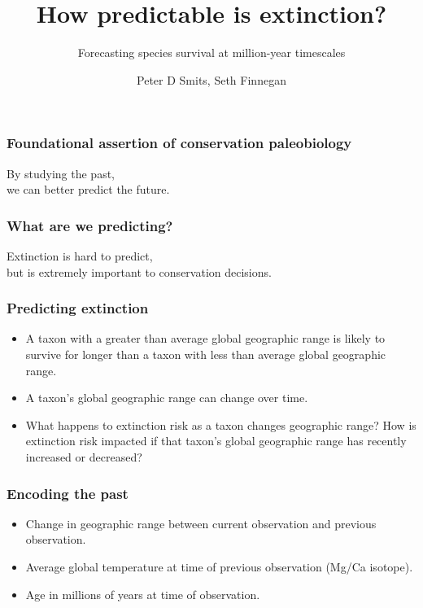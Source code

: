 \documentclass{beamer}
\title{How predictable is extinction?}
\subtitle{Forecasting species survival at million-year timescales}
\author{Peter D Smits, Seth Finnegan}
\institute{Department of Integrative Biology, University of California -- Berkeley}
\date{}
\begin{document}
\begin{frame}
  \maketitle
\end{frame}


\begin{frame}
  \frametitle{Foundational assertion of conservation paleobiology }

  \begin{center}
    \begin{LARGE}
      By studying the \alert{past}, \\we can better predict the \alert{future}.
    \end{LARGE}
  \end{center}

\end{frame}


\begin{frame}
  \frametitle{What are we predicting?}
  
  \begin{center}
    \begin{LARGE}
      Extinction is \alert{hard} to predict, \\but is extremely \alert{important} to conservation decisions.
    \end{LARGE}
  \end{center}

\end{frame}


\begin{frame}
  \frametitle{Predicting extinction}

  \begin{itemize}[<+->]
    \item A taxon with a \alert{greater than average} global geographic range is likely to survive for longer than a taxon with \alert{less than average} global geographic range.
    \item A taxon's global geographic range can change over time.
    \item What happens to extinction risk as a taxon changes geographic range? How is extinction risk impacted if that taxon's global geographic range has recently \alert{increased} or \alert{decreased}?
  \end{itemize}

\end{frame}


\begin{frame}
  \frametitle{Encoding the past}

  \begin{itemize}
    \item Change in geographic range between current observation and previous observation.
    \item Average global temperature at time of previous observation (Mg/Ca isotope).
    \item Age in millions of years at time of observation.
  \end{itemize}

\end{frame}
\end{document}
